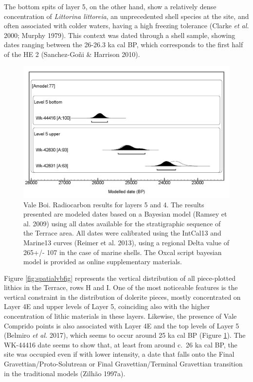 \documentclass[12pt,twoside]{reedthesis}
\begin{document}
The bottom spits of layer 5, on the other hand, show a relatively dense concentration of \emph{Littorina littoreia}, an unprecedented shell species at the site, and often associated with colder waters, having a high freezing tolerance (Clarke \emph{et al.} 2000; Murphy 1979). This context was dated through a shell sample, showing dates ranging between the 26-26.3 ka cal BP, which corresponds to the first half of the HE 2 (Sanchez-Goñi \& Harrison 2010).
\begin{figure}[H]

{\centering \includegraphics[width=0.6\linewidth]{figure/c14_VB} 

}

\caption{Vale Boi. Radiocarbon results for layers 5 and 4. The results presented are modeled dates based on a Bayesian model (Ramsey et al. 2009) using all dates available for the stratigraphic sequence of the Terrace area. All dates were calibrated using the IntCal13 and Marine13 curves (Reimer et al. 2013), using a regional Delta value of 265+/- 107 in the case of marine shells. The Oxcal script bayesian model is provided as online supplementary materials.}\label{fig:c14VB}
\end{figure}
Figure \ref{fig:spatialvbfig} represents the vertical distribution of all piece-plotted lithics in the Terrace, rows H and I. One of the most noticeable features is the vertical constraint in the distribution of dolerite pieces, mostly concentrated on Layer 4E and upper levels of Layer 5, coinciding also with the higher concentration of lithic materials in these layers. Likewise, the presence of Vale Comprido points is also associated with Layer 4E and the top levels of Layer 5 (Belmiro \emph{et al.} 2017), which seems to occur around 25 ka cal BP (Figure \ref{fig:c14VB}). The WK-44416 date seems to show that, at least from around c.~26 ka cal BP, the site was occupied even if with lower intensity, a date that falls onto the Final Gravettian/Proto-Solutrean or Final Gravettian/Terminal Gravettian transition in the traditional models (Zilhão 1997a).
\end{document}
